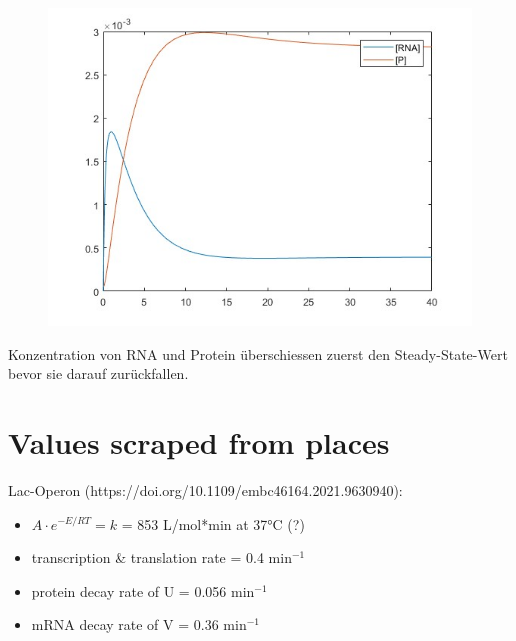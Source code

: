\documentclass{article}
\begin{document}
\begin{figure}[h]
    \centering
    \includegraphics[width=0.8\linewidth]{images/negative_autoregulation.jpg}
\end{figure}

Konzentration von RNA und Protein überschiessen zuerst den Steady-State-Wert bevor sie darauf zurückfallen.


\newpage
\section{Values scraped from places}
Lac-Operon (https://doi.org/10.1109/embc46164.2021.9630940):\\
\begin{itemize}
    \item $A \cdot e^{-E/RT} = k$ = 853 L/mol*min at 37°C (?)
    \item transcription \& translation rate = 0.4 min$^{-1}$
    \item protein decay rate of U = 0.056 min$^{-1}$
    \item mRNA decay rate of V = 0.36 min$^{-1}$
\end{itemize}
\end{document}
